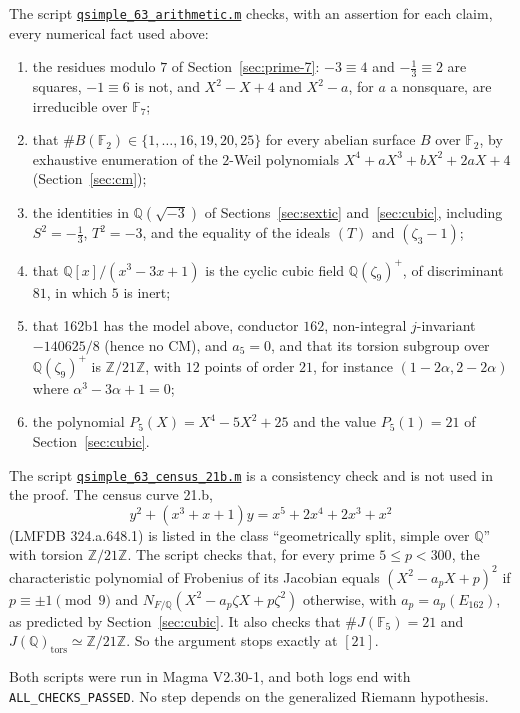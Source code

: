 \documentclass[11pt]{article}
\newcommand{\Q}{\mathbb Q}
\newcommand{\Z}{\mathbb Z}
\newcommand{\F}{\mathbb F}
\begin{document}
The script
\href{https://genus-2-torsion.github.io/data/knowledge/sources/qsimple_63_arithmetic.m}{\texttt{qsimple\_63\_arithmetic.m}}
checks, with an assertion for each claim, every numerical fact used
above:
\begin{enumerate}
\item the residues modulo \(7\) of Section~\ref{sec:prime-7}:
\(-3\equiv4\) and \(-\tfrac13\equiv2\) are squares, \(-1\equiv6\) is
not, and \(X^2-X+4\) and \(X^2-a\), for \(a\) a nonsquare, are
irreducible over \(\F_7\);
\item that \(\#B(\F_2)\in\{1,\dots,16,19,20,25\}\) for every abelian
surface \(B\) over \(\F_2\), by exhaustive enumeration of the
\(2\)-Weil polynomials \(X^4+aX^3+bX^2+2aX+4\) (Section~\ref{sec:cm});
\item the identities in \(\Q(\sqrt{-3})\) of Sections~\ref{sec:sextic}
and~\ref{sec:cubic}, including \(S^2=-\tfrac13\), \(T^2=-3\), and the
equality of the ideals \((T)\) and \((\zeta_3-1)\);
\item that \(\Q[x]/(x^3-3x+1)\) is the cyclic cubic field
\(\Q(\zeta_9)^+\), of discriminant \(81\), in which \(5\) is inert;
\item that 162b1 has the model above, conductor \(162\), non-integral
\(j\)-invariant \(-140625/8\) (hence no CM), and \(a_5=0\), and that its
torsion subgroup over \(\Q(\zeta_9)^+\) is \(\Z/21\Z\), with \(12\)
points of order \(21\), for instance \((1-2\alpha,2-2\alpha)\) where
\(\alpha^3-3\alpha+1=0\);
\item the polynomial \(P_5(X)=X^4-5X^2+25\) and the value \(P_5(1)=21\)
of Section~\ref{sec:cubic}.
\end{enumerate}

The script
\href{https://genus-2-torsion.github.io/data/knowledge/sources/qsimple_63_census_21b.m}{\texttt{qsimple\_63\_census\_21b.m}}
is a consistency check and is not used in the proof. The census curve
21.b,
\[
 y^2+(x^3+x+1)y=x^5+2x^4+2x^3+x^2
\]
(LMFDB 324.a.648.1) is listed in the class ``geometrically split, simple
over \(\Q\)'' with torsion \(\Z/21\Z\). The script checks that, for
every prime \(5\leq p<300\), the characteristic polynomial of Frobenius
of its Jacobian equals \((X^2-a_pX+p)^2\) if \(p\equiv\pm1\pmod9\) and
\(N_{F/\Q}(X^2-a_p\zeta X+p\zeta^2)\) otherwise, with
\(a_p=a_p(E_{162})\), as predicted by Section~\ref{sec:cubic}. It also
checks that \(\#J(\F_5)=21\) and
\(J(\Q)_{\mathrm{tors}}\simeq\Z/21\Z\). So the argument stops exactly
at \([21]\).

Both scripts were run in Magma V2.30-1, and both logs end with
\texttt{ALL\_CHECKS\_PASSED}. No step depends on the generalized Riemann
hypothesis.
\end{document}
